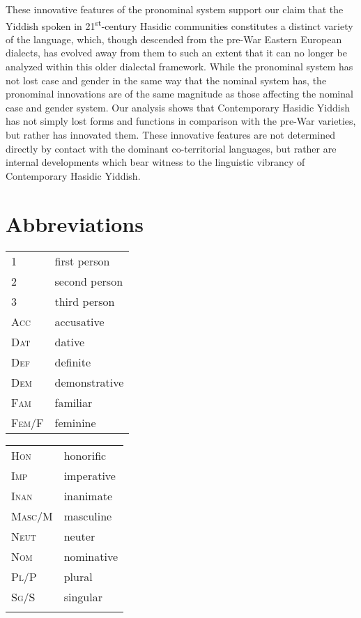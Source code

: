 \documentclass[output=paper, hidelinks]{langscibook}
\begin{document}
These innovative features of the pronominal system support our claim that the Yiddish spoken in 21\textsuperscript{st}-century Hasidic communities constitutes a distinct variety of the language, which, though descended from the pre-War Eastern European dialects, has evolved away from them to such an extent that it can no longer be analyzed within this older dialectal framework. While the pronominal system has not lost case and gender in the same way that the nominal system has, the pronominal innovations are of the same magnitude as those affecting the nominal case and gender system. Our analysis shows that Contemporary Hasidic Yiddish has not simply lost forms and functions in comparison with the pre-War varieties, but rather has innovated them. These innovative features are not determined directly by contact with the dominant co-territorial languages, but rather are internal developments which bear witness to the linguistic vibrancy of Contemporary Hasidic Yiddish. 






\section*{Abbreviations}
\begin{tabularx}{.45\textwidth}{lQ}
\textsc{1} & first person \\
\textsc{2} & second person \\
\textsc{3} & third person \\
\textsc{Acc} & accusative \\
\textsc{Dat}& dative\\
\textsc{Def}& definite\\
\textsc{Dem}& demonstrative\\
\textsc{Fam}& familiar\\
\textsc{Fem/F}& feminine\\
\end{tabularx}
\begin{tabularx}{.45\textwidth}{lQ}
\textsc{Hon}& honorific\\
\textsc{Imp}& imperative\\
\textsc{Inan}& inanimate\\
\textsc{Masc/M}& masculine\\
\textsc{Neut} & neuter \\
\textsc{Nom} & nominative \\
\textsc{Pl/P} & plural \\
\textsc{Sg/S} & singular \\
\\
\end{tabularx}
\end{document}
